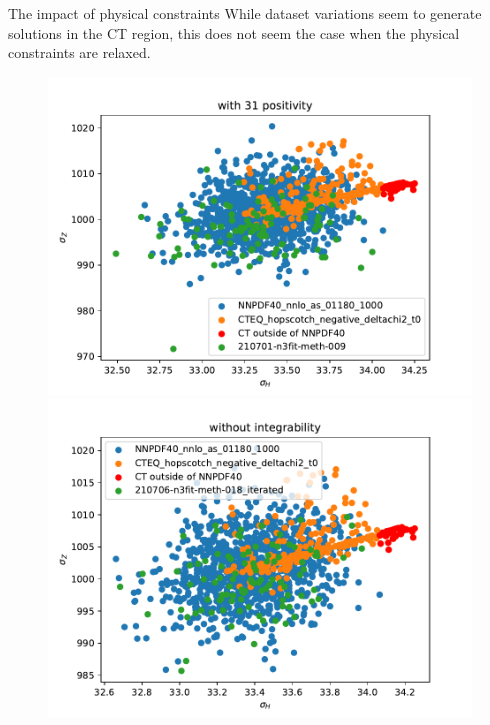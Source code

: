 \documentclass[aspectratio=169,10pt]{beamer}
\begin{document}
\begin{frame}[t]{The impact of physical constraints}
  While dataset variations seem to generate solutions in the CT region, this does not seem the case when the physical constraints are relaxed.
  \begin{figure}
    \centering
    \includegraphics[height=.55\textheight]{with_31_positivity.pdf}
    \includegraphics[height=.55\textheight]{without_integrability.pdf}
  \end{figure}
\end{frame}
\end{document}
